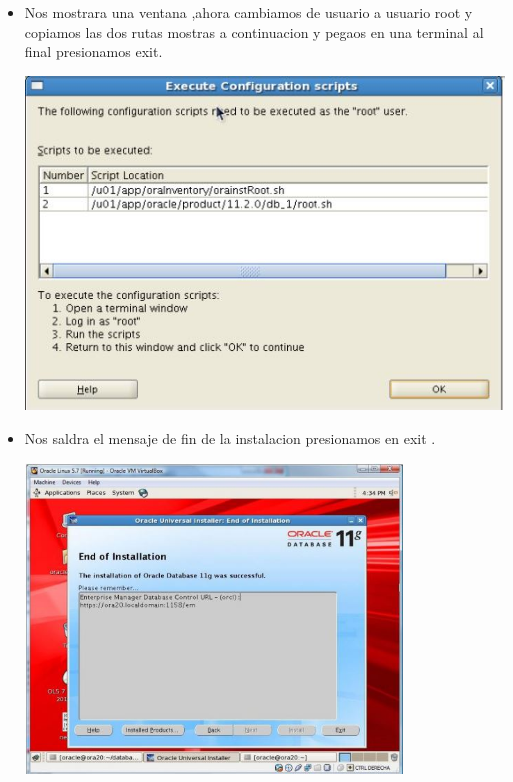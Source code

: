 \begin{itemize}
	\item Nos mostrara una ventana ,ahora cambiamos de usuario a usuario root y copiamos las dos rutas mostras a continuacion y pegaos en una terminal al final presionamos exit.
	\begin{center}
	\includegraphics[width=13cm]{./Imagenes/img59} 
	\end{center}
	
	\item Nos saldra el mensaje de fin de la instalacion presionamos en exit   .
	\begin{center}
	\includegraphics[width=10cm]{./Imagenes/img60} 
	\end{center}
	
\newpage


\end{itemize}
